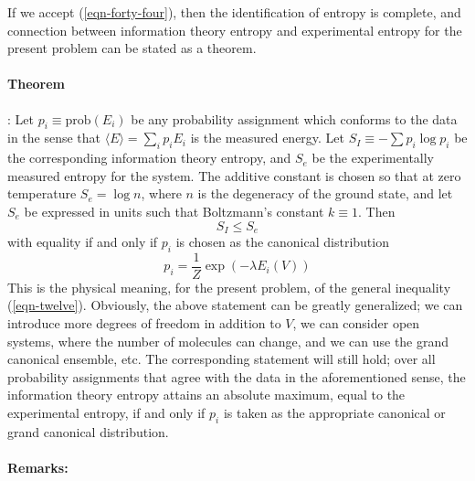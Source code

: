 \documentclass[]{article}
\begin{document}
If we accept (\ref{eqn-forty-four}), then the identification of entropy is complete, and connection between information theory entropy and experimental entropy for the present problem can be stated as a theorem.

\paragraph{Theorem}: Let $p _{i} \equiv  \text{prob} \left( E _{ i }\right)$ be any probability assignment which conforms to the data in the sense that $\langle E \rangle=\sum_{ i } p _{ i } E _{ i }$ is the
measured energy. Let $S_{I} \equiv-\sum p_{i} \log p_{i}$ be the corresponding information theory entropy, and $S _{e}$ be the experimentally measured entropy for the system. The additive constant is chosen so that at zero temperature $S_{e}=\log n$, where $n$ is the degeneracy of the ground state, and let $S_{e}$ be expressed in units such that Boltzmann's constant $k \equiv 1$. Then
\begin{equation}
S _{ I } \leq S _{ e }
\end{equation}
with equality if and only if $p _{ i }$ is chosen as the canonical distribution
\begin{equation}
p_{i}=\frac{1}{Z} \exp \left(-\lambda E_{i}(V)\right) \label{eqn-forty-six}
\end{equation}
This is the physical meaning, for the present problem, of the general inequality (\ref{eqn-twelve}). Obviously, the above statement can be greatly generalized; we can introduce more degrees of freedom in addition to $V$, we can consider open systems, where the number of molecules can change, and we can use the grand canonical ensemble, etc. The corresponding statement will still hold; over all probability assignments that agree with the data in the aforementioned sense, the information theory entropy attains an absolute maximum, equal to the experimental entropy, if and only if $p _{ i }$ is taken as the appropriate canonical or grand canonical distribution. 

\paragraph{Remarks:} 
\end{document}
